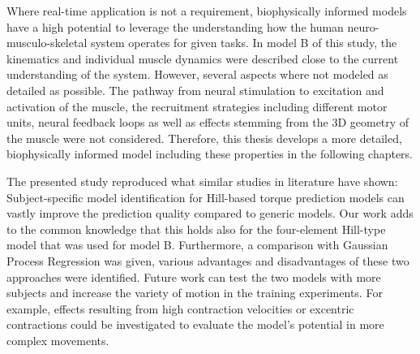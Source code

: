 Where real-time application is not a requirement, biophysically informed models have a high potential to leverage the understanding how the human neuro-musculo-skeletal system operates for given tasks.
In model B of this study, the kinematics and individual muscle dynamics were described close to the current  understanding of the system. However, several aspects where not modeled as detailed as possible. The pathway from neural stimulation to excitation and activation of the muscle, the recruitment strategies including different motor units, neural feedback loops as well as effects stemming from the 3D geometry of the muscle were not considered. Therefore, this thesis develops a more detailed, biophysically informed model including these properties in the following chapters.

The presented study reproduced what similar studies in literature have shown: Subject-specific model identification for Hill-based torque prediction models can vastly improve the prediction quality compared to generic models. Our work adds to the common knowledge that this holds also for the four-element Hill-type model that was used for model B. Furthermore, a comparison with Gaussian Process Regression was given, various advantages and disadvantages of these two approaches were identified. Future work can test the two models with more subjects and increase the variety of motion in the training experiments. For example, effects resulting from high contraction velocities or excentric contractions could be investigated to evaluate the model's potential in more complex movements.

